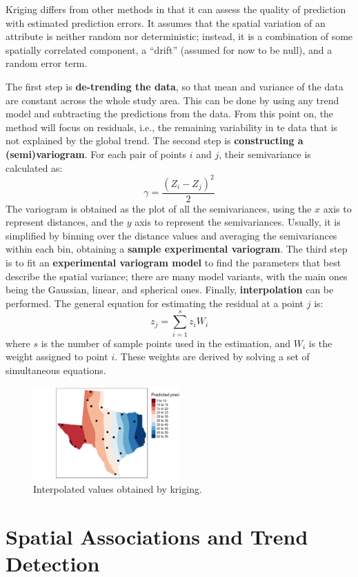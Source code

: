Kriging differs from other methods in that it can assess the quality of prediction with estimated prediction errors. It assumes that the spatial variation of an attribute is neither random nor deterministic; instead, it is a combination of some spatially correlated component, a ``drift'' (assumed for now to be null), and a random error term.

The first step is \textbf{de-trending the data}, so that mean and variance of the data are constant across the whole study area. This can be done by using any trend model and subtracting the predictions from the data. From this point on, the method will focus on residuals, i.e., the remaining variability in te data that is not explained by the global trend. The second step is \textbf{constructing a (semi)variogram}. For each pair of points $i$ and $j$, their semivariance is calculated as:
\begin{equation*}
    \gamma = \frac{(Z_i - Z_j)^2}{2}
\end{equation*}
The variogram is obtained as the plot of all the semivariances, using the $x$ axis to represent distances, and the $y$ axis to represent the semivariances. Usually, it is simplified by binning over the distance values and averaging the semivariances within each bin, obtaining a \textbf{sample experimental variogram}. The third step is to fit an \textbf{experimental variogram model} to find the parameters that best describe the spatial variance; there are many model variants, with the main ones being the Gaussian, linear, and spherical ones. Finally, \textbf{interpolation} can be performed. The general equation for estimating the residual at a point $j$ is:
\begin{equation*}
    z_j = \sum_{i=1}^s z_i W_i
\end{equation*}
where $s$ is the number of sample points used in the estimation, and $W_i$ is the weight assigned to point $i$. These weights are derived by solving a set of simultaneous equations.
\begin{figure}[!ht]
    \centering
    \includegraphics[width=0.5\textwidth]{img/interpolation_kriging.png}
    \caption{Interpolated values obtained by kriging.}
    \label{fig:interpolation_kriging}
\end{figure}

\section{Spatial Associations and Trend Detection}
